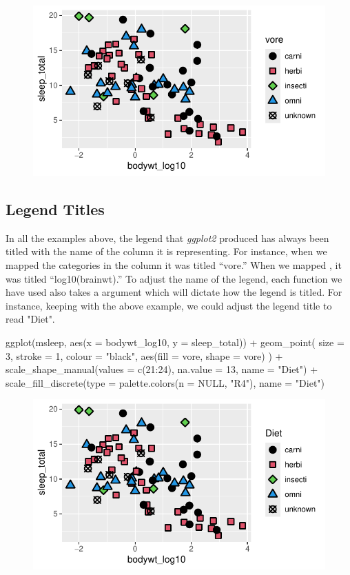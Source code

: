 \begin{figure}[H]
\includegraphics[scale = .75]{graphics/ch2Figs/ggEx_30.pdf}
\end{figure}

\subsection{Legend Titles}

In all the examples above, the legend that \textit{ggplot2} produced has always been titled with the name of the column it is representing. For instance, when we mapped the categories in the  column it was titled ``vore.'' When we mapped , it was titled ``log10(brainwt).'' To adjust the name of the legend, each  function we have used also takes a  argument which will dictate how the legend is titled. For instance, keeping with the above example, we could adjust the legend title to read "Diet".

\begin{inR}
ggplot(msleep, aes(x = bodywt_log10, y = sleep_total)) +
  geom_point(
    size = 3, stroke = 1, colour = "black",
    aes(fill = vore, shape = vore)
  ) +
  scale_shape_manual(values = c(21:24), na.value = 13, name = "Diet") +
  scale_fill_discrete(type = palette.colors(n = NULL, "R4"), name = "Diet")
\end{inR}

\vspace{2em}

\begin{figure}[H]
\includegraphics[scale = .75]{graphics/ch2Figs/ggEx_31.pdf}
\end{figure}

